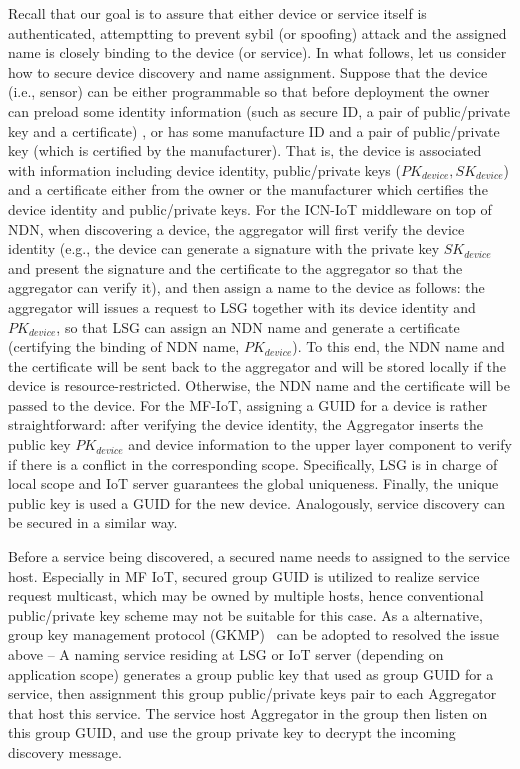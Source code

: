 Recall that our goal is to assure that either device or service itself is authenticated, attemptting to prevent sybil (or spoofing) attack \cite{sybil} and the assigned name is closely binding to the device (or service). In what follows, let us consider how to secure device discovery and name assignment. Suppose that the device (i.e., sensor) can be either programmable so that before deployment the owner can preload some identity information (such as secure ID, a pair of public/private key and a certificate) , or has some manufacture ID and a pair of public/private key (which is certified by the manufacturer). That is, the device is associated with information including device identity, public/private keys ($PK_{device}, SK_{device}$) and a certificate either from the owner or the manufacturer which certifies the device identity and public/private keys. For the ICN-IoT middleware on top of NDN, when discovering a device, the aggregator will first verify the device identity (e.g., the device can generate a signature with the private key $SK_{device}$ and present the signature and the certificate to the aggregator so that the aggregator can verify it), and then assign a name to the device as follows: the aggregator will issues a request to LSG together with its device identity and $PK_{device}$, so that LSG can assign an NDN name and generate a certificate (certifying the binding of NDN name, $PK_{device}$). To this end, the NDN name and the certificate will be sent back to the aggregator and will be stored locally if the device is resource-restricted. Otherwise, the NDN name and the certificate will be passed to the device. For the MF-IoT, assigning a GUID for a device is rather straightforward: after verifying the device identity, the Aggregator
inserts the public key $PK_{device}$ and device information to the upper layer component to verify if there is a conflict in the corresponding scope. Specifically, LSG is in charge of local scope and IoT server guarantees the global uniqueness. Finally, the unique public key is used a GUID for the new device. Analogously, service discovery can be secured in a similar way.

Before a service being discovered, a secured name needs to assigned to the service host. Especially in MF IoT, secured group GUID is utilized to realize service request multicast, which may be owned by multiple hosts, hence conventional public/private key scheme may not be suitable for this case. As a alternative, group key management protocol (GKMP)~\cite{harney1997group} can be adopted to resolved the issue above -- A naming service residing at LSG or IoT server (depending on application scope) generates a group public key that used as group GUID for a service, then assignment this group public/private keys pair to each Aggregator that host this service. The service host Aggregator in the group then listen on this group GUID, and use the group private key to decrypt the incoming discovery message. 
 
